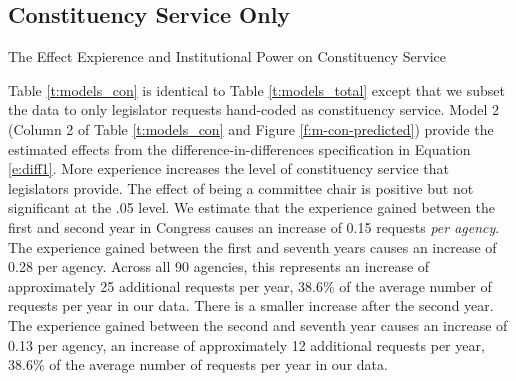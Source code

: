 \documentclass[12pt]{article}
\begin{document}
{\subsection{Constituency Service Only}

\begin{table}[hbt!]
\caption{The Effect Expierence and Institutional Power on Constituency Service} \label{t:models_con}
\begin{minipage}{\textwidth}
\begin{center}
\end{center}
\end{minipage}
\end{table}

Table \ref{t:models_con} is identical to Table \ref{t:models_total} except that we subset the data to only legislator requests hand-coded as constituency service. 
Model 2 (Column 2 of Table \ref{t:models_con} and Figure \ref{f:m-con-predicted}) provide the estimated effects from the difference-in-differences specification in Equation \ref{e:diff1}. More experience increases the level of constituency service that legislators provide. The effect of being a committee chair is positive but not significant at the .05 level. We estimate that the experience gained between the first and second year in Congress causes an increase of 0.15 requests \textit{per agency}. The experience gained between the first and seventh years causes an increase of 0.28 per agency. Across all 90 agencies, this represents an increase of approximately 25 additional requests per year, 38.6\% of the average number of requests per year in our data. There is a smaller increase after the second year. The experience gained between the second and seventh year causes an increase of 0.13 per agency, an increase of approximately 12 additional requests per year, 38.6\% of the average number of requests per year in our data.


}
\end{document}
